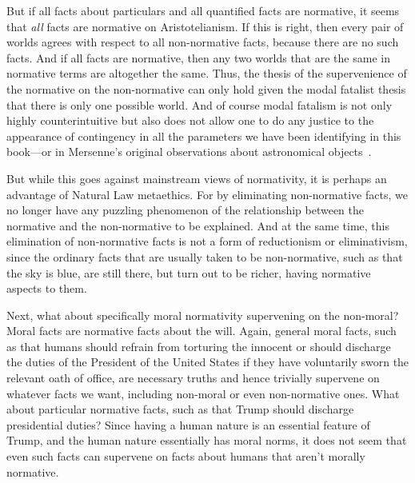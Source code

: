 But if all facts about particulars and all quantified facts are normative, it seems that \textit{all} facts
are normative on Aristotelianism.  If this is right, then every pair of worlds agrees with respect to all 
non-normative facts, because there are no such facts. And if all facts are normative, then any two worlds 
that are the same in normative terms are altogether the same. Thus, the thesis of the supervenience of the 
normative on the non-normative can only hold given the modal fatalist thesis that there is only one possible 
world. And of course modal fatalism is not only highly counterintuitive but also does not allow one to do
any justice to the appearance of contingency in all the parameters we have been identifying in this book---or
in Mersenne's original observations about astronomical objects~\parencite[pp.~97--98,282--283]{MersenneImpiety}.

But while this goes against mainstream views of normativity, it is perhaps an advantage of Natural Law metaethics. For by eliminating non-normative facts, we no longer have any puzzling phenomenon of the relationship 
between the normative and the non-normative to be explained. And at the same time, this elimination of
non-normative facts is not a form of reductionism or eliminativism, since the ordinary facts that are
usually taken to be non-normative, such as that the sky is blue, are still there, but turn out to be richer,
having normative aspects to them.

Next, what about specifically moral normativity supervening on the non-moral? Moral facts are normative facts about the
will. Again, general moral facts, such as that humans should refrain from torturing the innocent or should
discharge the duties of the President of the United States if they have voluntarily sworn the
relevant oath of office,
are necessary truths and hence trivially supervene on whatever facts we want, including
non-moral or even non-normative ones. What about particular normative facts, such as
that Trump should discharge presidential duties? Since having a human nature is an essential feature of
Trump, and the human nature essentially has moral norms, it does not seem that even such facts can supervene
on facts about humans that aren't morally normative.

